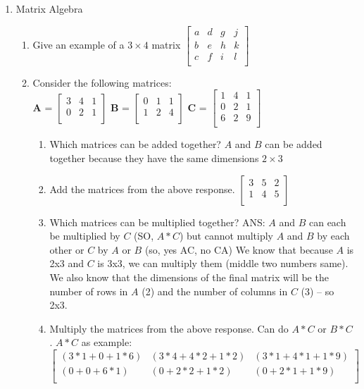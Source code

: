 \documentclass[11pt]{article}
\begin{document}
\begin{enumerate}
\item Matrix Algebra
\begin{enumerate}
\item Give an example of a $3 \times 4$ matrix  \color{gray}
$\begin{bmatrix}
  a & d & g & j \\
  b & e & h & k \\
  c & f & i & l \\
\end{bmatrix}$ \\ \color{black}
\item Consider the following matrices: \\
\textbf{A} =
$
\begin{bmatrix}
  3 & 4 & 1 \\
  0 & 2 & 1 \\
\end{bmatrix}$
\textbf{B} =
$\begin{bmatrix}
  0 & 1 & 1 \\
  1 & 2 & 4 \\
\end{bmatrix}$
\textbf{C} =
$\begin{bmatrix}
  1 & 4 & 1 \\
  0 & 2 & 1 \\
  6 & 2 & 9 \\
\end{bmatrix}$ \\
\begin{enumerate}
\item Which matrices can be added together?  \color{gray} $A$ and $B$ can be added together because they have the same dimensions $2 \times 3$ \color{black}
\item Add the matrices from the above response.  \color{gray} 
$\begin{bmatrix}
  3 & 5 & 2 \\
  1 & 4 & 5 \\
\end{bmatrix}$

\color{black} 
\item Which matrices can be multiplied together?  \color{gray} ANS: $A$ and $B$ can each be multiplied by $C$ (SO, $A*C$) but cannot multiply $A$ and $B$ by each other or $C$ by $A$ or $B$ (so, yes AC, no CA) We know that because $A$ is 2x3 and $C$ is 3x3, we can multiply them (middle two numbers same). We also know that the dimensions of the final matrix will be the number of rows in $A$ (2) and the number of columns in $C$ (3) -- so 2x3.  \color{black}
\item Multiply the matrices from the above response. \color{gray}
Can do $A*C$ or $B*C$. $A*C$ as example:
$\begin{bmatrix}
 (3*1+0+1*6) & (3*4+4*2+1*2) & (3*1+4*1+1*9) \\
 (0+0+6*1) & (0+2*2+1*2) & (0+2*1+1*9)\\
\end{bmatrix}$


\end{enumerate}
\end{enumerate}
\end{enumerate}
\end{document}
